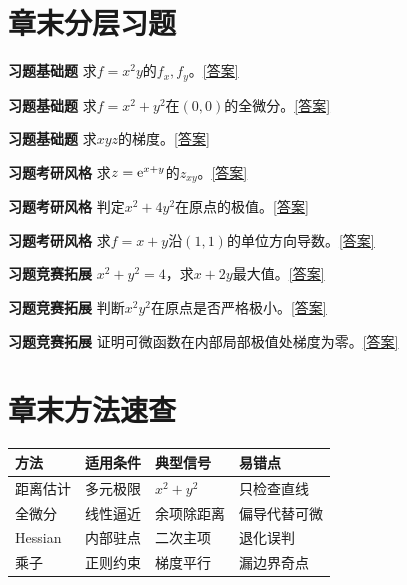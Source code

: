 






\section*{章末分层习题}
\label{q:6:1}\par\noindent\textbf{习题\theexercise\quad 基础题} 求$f=x^2y$的$f_x,f_y$。\quad\hyperref[a:6:1]{[答案]}\par
{}\label{q:6:2}\par\noindent\textbf{习题\theexercise\quad 基础题} 求$f=x^2+y^2$在$(0,0)$的全微分。\quad\hyperref[a:6:2]{[答案]}\par
{}\label{q:6:3}\par\noindent\textbf{习题\theexercise\quad 基础题} 求$xyz$的梯度。\quad\hyperref[a:6:3]{[答案]}\par
{}\label{q:6:4}\par\noindent\textbf{习题\theexercise\quad 考研风格} 求$z=\mathrm{e}^{x+y}$的$z_{xy}$。\quad\hyperref[a:6:4]{[答案]}\par
{}\label{q:6:5}\par\noindent\textbf{习题\theexercise\quad 考研风格} 判定$x^2+4y^2$在原点的极值。\quad\hyperref[a:6:5]{[答案]}\par
{}\label{q:6:6}\par\noindent\textbf{习题\theexercise\quad 考研风格} 求$f=x+y$沿$(1,1)$的单位方向导数。\quad\hyperref[a:6:6]{[答案]}\par
{}\label{q:6:7}\par\noindent\textbf{习题\theexercise\quad 竞赛拓展} $x^2+y^2=4$，求$x+2y$最大值。\quad\hyperref[a:6:7]{[答案]}\par
{}\label{q:6:8}\par\noindent\textbf{习题\theexercise\quad 竞赛拓展} 判断$x^2y^2$在原点是否严格极小。\quad\hyperref[a:6:8]{[答案]}\par
{}\label{q:6:9}\par\noindent\textbf{习题\theexercise\quad 竞赛拓展} 证明可微函数在内部局部极值处梯度为零。\quad\hyperref[a:6:9]{[答案]}\par
\section*{章末方法速查}
\par\noindent\begin{tabularx}{\textwidth}{p{23mm}XXX}\toprule 方法&适用条件&典型信号&易错点\\\midrule
距离估计&多元极限&$x^2+y^2$&只检查直线\\全微分&线性逼近&余项除距离&偏导代替可微\\Hessian&内部驻点&二次主项&退化误判\\乘子&正则约束&梯度平行&漏边界奇点\\
\bottomrule\end{tabularx}
